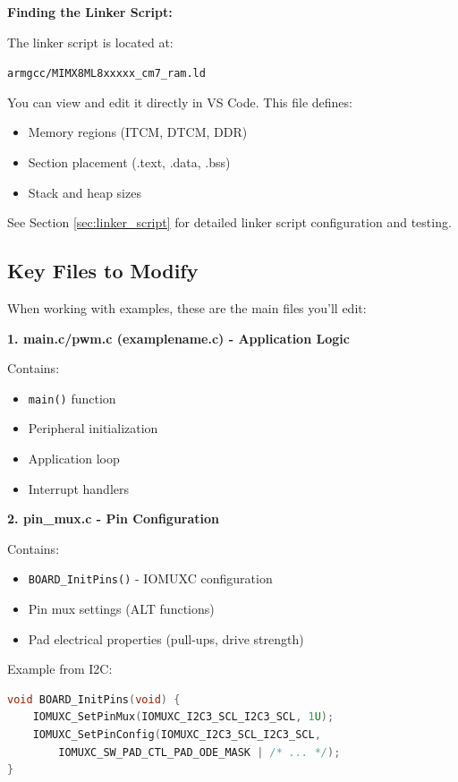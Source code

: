\documentclass[12pt,a4paper]{report}
\begin{document}
\begin{important}
\textbf{Finding the Linker Script:}

The linker script is located at:
\begin{center}
\texttt{armgcc/MIMX8ML8xxxxx\_cm7\_ram.ld}
\end{center}

You can view and edit it directly in VS Code. This file defines:
\begin{itemize}
    \item Memory regions (ITCM, DTCM, DDR)
    \item Section placement (.text, .data, .bss)
    \item Stack and heap sizes
\end{itemize}

See Section \ref{sec:linker_script} for detailed linker script configuration and testing.
\end{important}

\subsection{Key Files to Modify}

When working with examples, these are the main files you'll edit:

\textbf{1. main.c/pwm.c (examplename.c) - Application Logic}

Contains:
\begin{itemize}
    \item \texttt{main()} function
    \item Peripheral initialization
    \item Application loop
    \item Interrupt handlers
\end{itemize}

\textbf{2. pin\_mux.c - Pin Configuration}

Contains:
\begin{itemize}
    \item \texttt{BOARD\_InitPins()} - IOMUXC configuration
    \item Pin mux settings (ALT functions)
    \item Pad electrical properties (pull-ups, drive strength)
\end{itemize}

Example from I2C:
\begin{lstlisting}[language=c]
void BOARD_InitPins(void) {
    IOMUXC_SetPinMux(IOMUXC_I2C3_SCL_I2C3_SCL, 1U);
    IOMUXC_SetPinConfig(IOMUXC_I2C3_SCL_I2C3_SCL, 
        IOMUXC_SW_PAD_CTL_PAD_ODE_MASK | /* ... */);
}
\end{lstlisting}
\end{document}
